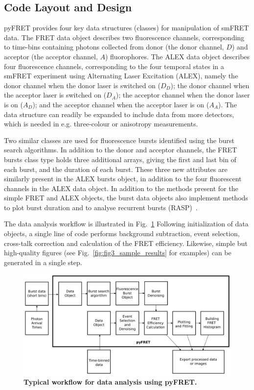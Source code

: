 \subsection{Code Layout and Design}
pyFRET provides four key data structures (classes) for manipulation of smFRET data. The FRET data object describes two fluorescence channels, corresponding to time-bins containing photons collected from donor (the donor channel, $D$) and acceptor (the acceptor channel, $A$) fluorophores. The ALEX data object describes four fluorescence channels, corresponding to the four temporal states in a smFRET experiment using Alternating Laser Excitation (ALEX), namely the donor channel when the donor laser is switched on ($D_D$); the donor channel when the acceptor laser is switched on ($D_A$); the acceptor channel when the donor laser is on ($A_D$); and the acceptor channel when the acceptor laser is on ($A_A$). The data structure can readily be expanded to include data from more detectors, which is needed in e.g. three-colour or anisotropy measurements.

Two similar classes are used for fluorescence bursts identified using the burst search algorithms. In addition to the donor and acceptor channels, the FRET bursts class type holds three additional arrays, giving the first and last bin of each burst, and the duration of each burst. These three new attributes are similarly present in the ALEX bursts object, in addition to the four fluorescent channels in the ALEX data object. In addition to the methods present for the simple FRET and ALEX objects, the burst data objects also implement methods to plot burst duration and to analyse recurrent bursts (RASP)~\cite{hoffmann11}. 

The data analysis workflow is illustrated in Fig.~\ref{fig:fig2_workflow} Following initialization of data objects, a single line of code performs background subtraction, event selection, cross-talk correction and calculation of the FRET efficiency. Likewise, simple but high-quality figures (see Fig.~\ref{fig:fig3_sample_results} for examples) can be generated in a single step.

\begin{figure}[!ht]
   \begin{center}
      \includegraphics*[clip=true, width=6in]{pyFRET/workflow.pdf}
      \caption{{\bf Typical workflow for data analysis using pyFRET.}}
      \label{fig:fig2_workflow}
   \end{center}
\end{figure}

